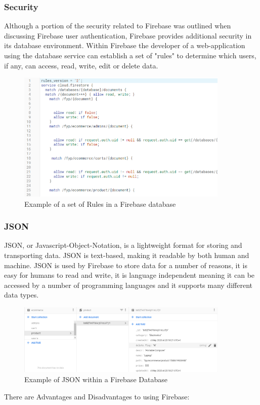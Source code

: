 \subsubsection{Security}
Although a portion of the security related to Firebase was outlined when discussing Firebase user authentication, Firebase provides additional security in its database environment. Within Firebase the developer of a web-application using the database service can establish a set of "rules" to determine which users, if any, can access, read, write, edit or delete data. 
\begin{figure}[h!]
    	\caption{Example of a set of Rules in a Firebase database}
	\centering
	\includegraphics[width=0.9\textwidth]{images/fbrules.png}
\end{figure}

\subsubsection{JSON}
JSON, or Javascript-Object-Notation, is a lightweight format for storing and transporting data. JSON is text-based, making it readable by both human and machine. JSON is used by Firebase to store data for a number of reasons, it is easy for humans to read and write, it is language independent meaning it can be accessed by a number of programming languages and it supports many different data types\cite{inproceedings}. 

\begin{figure}[h!]
    	\caption{Example of JSON within a Firebase Database}
	\centering
	\includegraphics[width=0.9\textwidth]{images/jsonfb.png}
\end{figure} 
\newpage
There are Advantages and Disadvantages to using Firebase\cite{advdis3}: \\

